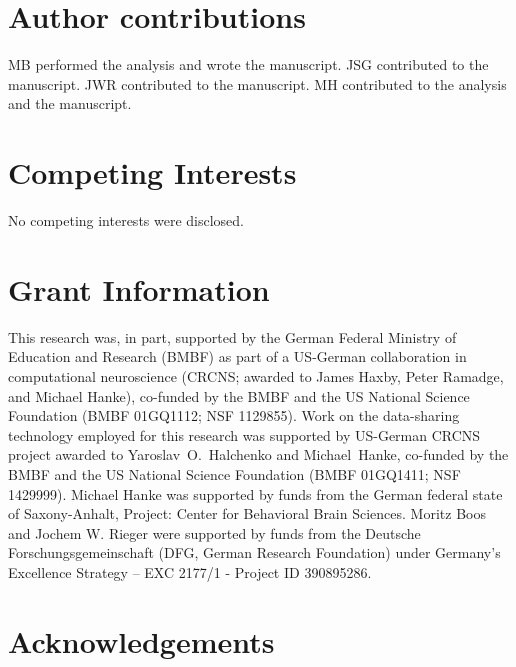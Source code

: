 \section*{Author contributions}

MB performed the analysis and wrote the manuscript.
JSG contributed to the manuscript.
JWR contributed to the manuscript.
MH contributed to the analysis and the manuscript.

\section*{Competing Interests}

No competing interests were disclosed.

\section*{Grant Information}

This research was, in part, supported by the German Federal Ministry of
Education and Research (BMBF) as part of a US-German collaboration in
computational neuroscience (CRCNS; awarded to James Haxby, Peter Ramadge, and
Michael Hanke), co-funded by the BMBF and the US National Science Foundation
(BMBF 01GQ1112; NSF 1129855).  Work on the data-sharing technology employed for
this research was supported by US-German CRCNS project awarded to
Yaroslav~O.~Halchenko and Michael~Hanke, co-funded by the BMBF and the US
National Science Foundation (BMBF 01GQ1411; NSF 1429999).  Michael Hanke was
supported by funds from the German federal state of Saxony-Anhalt, Project:
Center for Behavioral Brain Sciences.
Moritz Boos and Jochem W. Rieger were supported by funds from the Deutsche Forschungsgemeinschaft (DFG, German Research Foundation) under Germany's Excellence Strategy – EXC 2177/1 - Project ID 390895286.

\section*{Acknowledgements}

